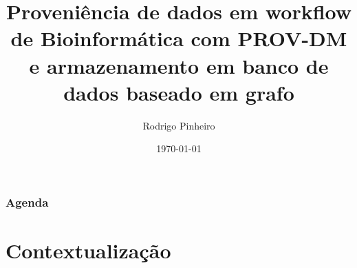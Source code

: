 \documentclass{beamer}
\title[Proveni\^encia de dados]{Proveni\^encia de dados em workflow de Bioinform\'atica com PROV-DM e armazenamento em banco de dados baseado em grafo} %
\author{Rodrigo Pinheiro} %
\institute[UnB] %
{
Universidade de Bras\'ilia \\ %
\medskip
Exame de Qualifica\c{c}\~ao de Mestrado Programa de P\'os-Gradua\c{c}\~ao em
Inform\'atica
Orientador(a): Maristela Terto de Holanda
}
\date{\today} %
\begin{document}
\begin{frame}
\titlepage %
\end{frame}

\begin{frame}
\frametitle{Agenda} %
\tableofcontents %
\end{frame}


\section{Contextualiza\c{c}\~ao} %

\end{document}
